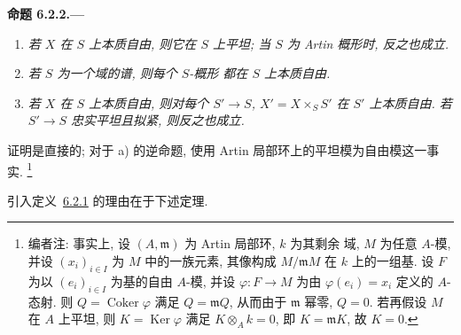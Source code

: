 \medskip
{}\label{prop:sga3-VIB-6.2.2}%
\noindent\textbf{命题 6.2.2.---}
\begin{enumerate}
\item[\textup{a)}]
  \emph{若 \(X\) 在 \(S\) 上本质自由, 则它在
  \(S\) 上平坦; 当 \(S\) 为 Artin 概形时, 反之也成立.}
\item[\textup{b)}]
  \emph{若 \(S\) 为一个域的谱, 则每个 \(S\)-概形
  都在 \(S\) 上本质自由.}
\item[\textup{c)}]
  \emph{若 \(X\) 在 \(S\) 上本质自由, 则对每个
  \(S'\to S\), \(X'=X\times_S S'\) 在 \(S'\) 上本质自由.
  若 \(S'\to S\) 忠实平坦且拟紧, 则反之也成立.}
\end{enumerate}

证明是直接的; 对于 \textup{a)} 的逆命题,
使用 Artin 局部环上的平坦模为自由模这一事实.%
\footnote{\label{note:sga3-VIB-54}编者注: 事实上, 设
\((A,\mathfrak m)\) 为 Artin 局部环, \(k\) 为其剩余
域, \(M\) 为任意 \(A\)-模, 并设
\((x_i)_{i\in I}\) 为 \(M\) 中的一族元素, 其像构成
\(M/\mathfrak mM\) 在 \(k\) 上的一组基. 设 \(F\) 为以 \((e_i)_{i\in I}\)
为基的自由 \(A\)-模, 并设
\(\varphi:F\to M\) 为由
\(\varphi(e_i)=x_i\) 定义的 \(A\)-态射. 则 \(Q=\operatorname{Coker}\varphi\)
满足 \(Q=\mathfrak mQ\), 从而由于 \(\mathfrak m\) 幂零,
\(Q=0\). 若再假设 \(M\) 在 \(A\) 上平坦,
则 \(K=\operatorname{Ker}\varphi\) 满足
\(K\otimes_Ak=0\), 即 \(K=\mathfrak mK\), 故 \(K=0\).}

引入定义~\hyperref[def:sga3-VIB-6.2.1]{6.2.1}
的理由在于下述定理.


